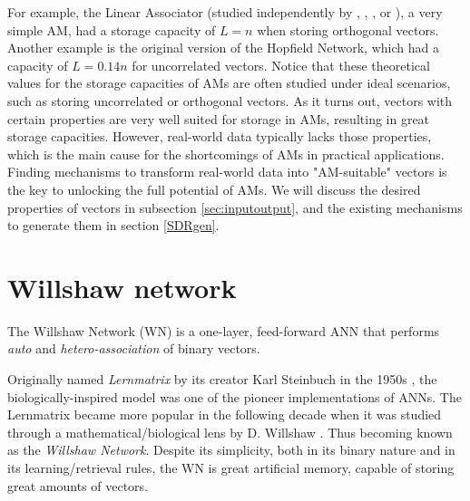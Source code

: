 \documentclass{article}
\begin{document}
For example, the Linear Associator (studied independently by \cite{anderson1968memory}, \cite{kohonen1972correlation}, \cite{anderson1972simple}, or \cite{nakano1972associatron}), a very simple AM, had a storage capacity of $L=n$ when storing orthogonal vectors. Another example is the original version of the Hopfield Network, which had a capacity of $L = 0.14n$ for uncorrelated vectors. 
Notice that these theoretical values for the storage capacities of AMs are often studied under ideal scenarios, such as storing uncorrelated or orthogonal vectors. As it turns out, vectors with certain properties are very well suited for storage in AMs, resulting in great storage capacities. However, real-world data typically lacks those properties, which is the main cause for the shortcomings of AMs in practical applications. Finding mechanisms to transform real-world data into "AM-suitable" vectors is the key to unlocking the full potential of AMs. We will discuss the desired properties of vectors in subsection \ref{sec:inputoutput}, and the existing mechanisms to generate them in section \ref{SDRgen}.


\section{Willshaw network}
The Willshaw Network (WN) \cite{willshaw1969non} is a one-layer, feed-forward ANN that performs \textit{auto} and \textit{hetero-association} of binary vectors.

Originally named \textit{Lernmatrix} by its creator Karl Steinbuch in the 1950s \cite{steinbuch1961lernmatrix}, the biologically-inspired model was one of the pioneer implementations of ANNs.
The Lernmatrix became more popular in the following decade when it was studied through a mathematical/biological lens by D. Willshaw \cite{willshaw1969non}. Thus becoming known as the \textit{Willshaw Network}. Despite its simplicity, both in its binary nature and in its learning/retrieval rules, the WN is great artificial memory, capable of storing great amounts of vectors.
\end{document}
